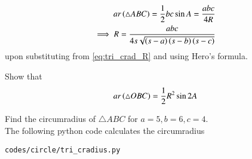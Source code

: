 \begin{align}
ar\left(\triangle ABC\right) = \frac{1}{2}bc \sin A = \frac{abc}{4R}&
\\
\implies R = \frac{abc}{4s\sqrt{\left(s-a\right)\left(s-b\right)\left(s-c\right)}}&
\end{align}
%
upon substituting from \eqref{eq:tri_crad_R} and using Hero's formula.
%
\item Show that
%
\begin{align}
\label{eq:circ_area_chord}
ar\left(\triangle OBC\right) = \frac{1}{2}R^2\sin 2A
\end{align}
%
\item Find the circumradius of $\triangle ABC$ for $a = 5, b = 6, c = 4$.
%
\\
\solution The following python code calculates the circumradius
\begin{lstlisting}
codes/circle/tri_cradius.py
\end{lstlisting}
\fi
